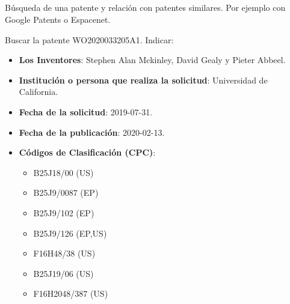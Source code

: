 \subsection{}

Búsqueda de una patente y relación con patentes similares. Por ejemplo con Google Patents o Espacenet.

Buscar la patente WO2020033205A1. Indicar: 
\begin{itemize}
    \item \textbf{Los Inventores}: Stephen Alan Mckinley, David Gealy y Pieter Abbeel.
    \item \textbf{Institución o persona que realiza la solicitud}: Universidad de California.
    \item \textbf{Fecha de la solicitud}: 2019-07-31.
    \item \textbf{Fecha de la publicación}: 2020-02-13.
    \item \textbf{Códigos de Clasificación (CPC)}:
    \begin{itemize}
        \item B25J18/00 (US) 
        \item B25J9/0087 (EP)
        \item B25J9/102 (EP)
        \item B25J9/126 (EP,US)
        \item F16H48/38 (US) 
        \item B25J19/06 (US)
        \item F16H2048/387 (US)
    \end{itemize}
\end{itemize}



